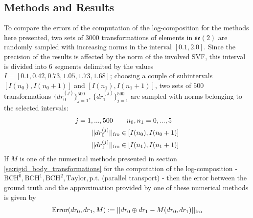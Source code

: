 \subsection{Methods and Results}

To compare the errors of the computation of the log-composition for the methods here presented, two sets of $3000$ transformations of elements in $\mathfrak{se}(2)$ are randomly sampled with increasing norms in the interval $[0.1, 2.0]$. Since the precision of the results is affected by the norm of the involved SVF, this interval is divided into 6 segments delimited by the values $I = [0.1, 0.42, 0.73, 1.05, 1.73, 1.68 ]$; choosing a couple of subintervals $[I(n_0), I(n_0+1)]$ and $[I(n_1), I(n_1+1)]$, two sets of $500$ transformations $\{ dr_{0}^{(j)}\}_{j=1}^{500}$, $\{ dr_{1}^{(j)} \}_{j=1}^{500}$ are sampled with norms belonging to the selected intervals:
\begin{align*}
j=1,...,500 \quad &\quad  n_0, n_1 = 0,...,5 \\
\vert\lvert dr_{0}^{(j)} \rvert\vert_{\text{fro}} &\in [I(n_0), I(n_0+1)] \\
\vert\lvert dr_{1}^{(j)} \rvert\vert_{\text{fro}} &\in [I(n_1), I(n_1+1)]  
\end{align*} 
If $M$ is one of the numerical methods presented in section \ref{se:rigid_body_transformations} for the computation of the log-composition - $\text{BCH}^{0}, \text{BCH}^{1}, \text{BCH}^{2}, \text{Taylor}, \text{p.t.}$ (parallel transport) - 
then the error between the ground truth and the approximation provided by one of these numerical methods is given by
\begin{align*}
\text{Error}(dr_{0},dr_{1},M) 
:= 
\vert\lvert dr_{0} \oplus dr_{1}
- 
M(dr_{0}, dr_{1})  \rvert\vert_{\text{fro}} 
\end{align*}

